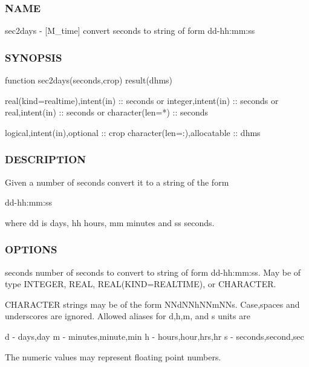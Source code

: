 \begin{DoxyVerb}
\subsubsection*{N\+A\+ME}

sec2days -\/ \mbox{[}M\+\_\+time\mbox{]} convert seconds to string of form dd-\/hh\+:mm\+:ss 

\subsubsection*{S\+Y\+N\+O\+P\+S\+IS}

\begin{DoxyVerb}function sec2days(seconds,crop) result(dhms)

 real(kind=realtime),intent(in) :: seconds
   or
 integer,intent(in)             :: seconds
   or
 real,intent(in)                :: seconds
   or
 character(len=*)               :: seconds

 logical,intent(in),optional    :: crop
 character(len=:),allocatable   :: dhms
\end{DoxyVerb}


\subsubsection*{D\+E\+S\+C\+R\+I\+P\+T\+I\+ON}

Given a number of seconds convert it to a string of the form

dd-\/hh\+:mm\+:ss

where dd is days, hh hours, mm minutes and ss seconds.

\subsubsection*{O\+P\+T\+I\+O\+NS}

seconds number of seconds to convert to string of form dd-\/hh\+:mm\+:ss. May be of type I\+N\+T\+E\+G\+ER, R\+E\+AL, R\+E\+AL(K\+I\+ND=R\+E\+A\+L\+T\+I\+ME), or C\+H\+A\+R\+A\+C\+T\+ER.

C\+H\+A\+R\+A\+C\+T\+ER strings may be of the form N\+Nd\+N\+Nh\+N\+Nm\+N\+Ns. Case,spaces and underscores are ignored. Allowed aliases for d,h,m, and s units are \begin{DoxyVerb}d -  days,day
m -  minutes,minute,min
h -  hours,hour,hrs,hr
s -  seconds,second,sec
\end{DoxyVerb}


The numeric values may represent floating point numbers.


\end{DoxyVerb}
